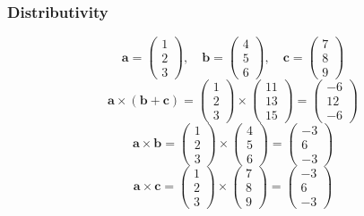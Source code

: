 \documentclass[a4paper,12pt]{article}
\begin{document}
\begin{itemize}[leftmargin=*]
\subsubsection*{Distributivity}
\[
\mathbf{a} = \begin{pmatrix} 1 \\ 2 \\ 3 \end{pmatrix}, \quad \mathbf{b} = \begin{pmatrix} 4 \\ 5 \\ 6 \end{pmatrix}, \quad \mathbf{c} = \begin{pmatrix} 7 \\ 8 \\ 9 \end{pmatrix}
\]
\[
\mathbf{a} \times (\mathbf{b} + \mathbf{c}) = \begin{pmatrix} 1 \\ 2 \\ 3 \end{pmatrix} \times \begin{pmatrix} 11 \\ 13 \\ 15 \end{pmatrix} = \begin{pmatrix} -6 \\ 12 \\ -6 \end{pmatrix}
\]
\[
\mathbf{a} \times \mathbf{b} = \begin{pmatrix} 1 \\ 2 \\ 3 \end{pmatrix} \times \begin{pmatrix} 4 \\ 5 \\ 6 \end{pmatrix} = \begin{pmatrix} -3 \\ 6 \\ -3 \end{pmatrix}
\]
\[
\mathbf{a} \times \mathbf{c} = \begin{pmatrix} 1 \\ 2 \\ 3 \end{pmatrix} \times \begin{pmatrix} 7 \\ 8 \\ 9 \end{pmatrix} = \begin{pmatrix} -3 \\ 6 \\ -3 \end{pmatrix}
\]
\end{itemize}
\end{document}
